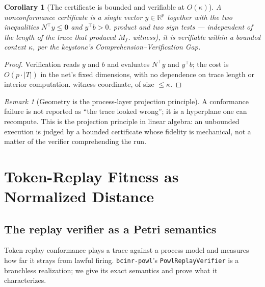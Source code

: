 \documentclass[11pt,oneside]{book}
\theoremstyle{definition}
\theoremstyle{plain}
\newtheorem{corollary}[theorem]{Corollary}
\theoremstyle{remark}
\newtheorem*{remark}{Remark}
\newcommand{\CL}{\kappa}                       %
\newcommand{\Nmat}{N}                 %
\newcommand{\code}[1]{\texttt{#1}}
\begin{document}
\begin{corollary}[The certificate is bounded and verifiable at $O(\CL)$]\label{cor:cert}
A nonconformance certificate is a single vector $y\in\mathbb{R}^{p}$ together with the two
inequalities $\Nmat^{\!\top}y\le\bm 0$ and $y^{\!\top}b>0$.%
product and two sign tests --- independent of the length of the trace that produced $M_f$.%
witness), it is verifiable within a bounded context $\CL$, per the keystone's
Comprehension--Verification Gap.
\end{corollary}

\begin{proof}
Verification reads $y$ and $b$ and evaluates $\Nmat^{\!\top}y$ and $y^{\!\top}b$; the cost is $O(p\cdot|T|)$ in the net's fixed dimensions, with no dependence
on trace length or interior computation.%
witness coordinate, of size $\le\CL$. \end{proof}

\begin{remark}[Geometry is the process-layer projection principle]
A conformance failure is not reported as ``the trace looked wrong''; it is a hyperplane one can
recompute. This is the projection principle in linear algebra: an unbounded execution is
judged by a bounded certificate whose fidelity is mechanical, not a matter of the verifier
comprehending the run.
\end{remark}

\chapter{Token-Replay Fitness as Normalized Distance}
\label{ch:fitness}

\section{The replay verifier as a Petri semantics}

Token-replay conformance \cite{rozinat2008} plays a trace against a process model and measures
how far it strays from lawful firing. \code{bcinr-powl}'s \code{PowlReplayVerifier} is a
branchless realization; we give its exact semantics and prove what it characterizes.
\end{document}
